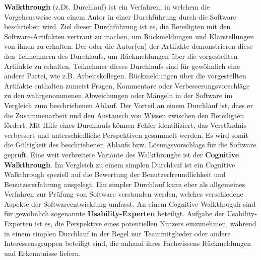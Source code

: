 \textbf{Walkthrough} (z.Dt. Durchlauf) ist ein Verfahren, in welchem die Vorgehensweise von einem Autor in einer Durchführung durch die Software beschrieben wird.
Ziel dieser Durchführung ist es, die Beteiligten mit den Software-Artifakten vertraut zu machen, um Rückmeldungen und Klarstellungen von ihnen zu erhalten.
Der oder die Autor(en) der Artifakte demonstrieren diese den Teilnehmern des Durchlaufs, um Rückmeldungen über die vorgestellten Artifakte zu erhalten.
Teilnehmer dieses Durchlaufs sind für gewöhnlich eine andere Partei, wie z.B. Arbeitskollegen.
Rückmeldungen über die vorgestellten Artifakte enthalten zumeist Fragen, Kommentare oder Verbesserungsvorschläge zu den wahrgenommenen Abweichungen oder Mängeln in der Software im Vergleich zum beschriebenen Ablauf.
Der Vorteil an einem Durchlauf ist, dass er die Zusammenarbeit und den Austausch von Wissen zwischen den Beteiligten fördert.
Mit Hilfe eines Durchlaufs können Fehler identifiziert, das Verständnis verbessert und unterschiedliche Perspektiven gesammelt werden.
Es wird somit die Gültigkeit des beschriebenen Ablaufs bzw. Lösungsvorschlags für die Software geprüft.
Eine weit verbreitete Variante des Walkthroughs ist der \textbf{Cognitive Walkthrough}.
Im Vergleich zu einem simplen Durchlauf ist ein Cognitive Walkthrough speziell auf die Bewertung der Benutzerfreundlichkeit und Benutzererfahrung ausgelegt.
Ein simpler Durchlauf kann eher als allgemeines Verfahren zur Prüfung von Software verstanden werden, welches verschiedene Aspekte der Softwareentwicklung umfasst.
An einem Cognitive Walkthroguh sind für gewöhnlich sogenannte \textbf{Usability-Experten} beteiligt.
Aufgabe der Usability-Experten ist es, die Perspektive eines potentiellen Nutzers einzunehmen, während in einem simplen Durchlauf in der Regel nur Teammitglieder oder andere Interessensgruppen beteiligt sind, die anhand ihres Fachwissens Rückmeldungen und Erkenntnisse liefern.

